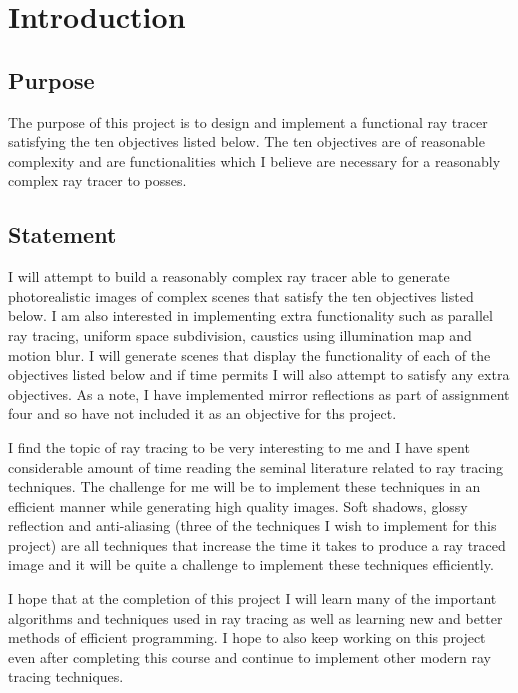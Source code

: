 \chapter{Introduction}

\section{Purpose}
The purpose of this project is to design and implement a functional ray tracer
satisfying the ten objectives listed below. The ten objectives are of reasonable
complexity and are functionalities which I believe are necessary for a 
reasonably complex ray tracer to posses.

\section{Statement}
I will attempt to build a reasonably complex ray tracer able to generate
photorealistic images of complex scenes that satisfy the ten objectives listed
below. I am also interested in implementing extra functionality such as parallel
ray tracing, uniform space subdivision, caustics using illumination map and
motion blur. I will generate scenes that display the functionality of each of
the objectives listed below and if time permits I will also attempt to satisfy
any extra objectives. As a note, I have implemented mirror reflections as part
of assignment four and so have not included it as an objective for ths project.

I find the topic of ray tracing to be very interesting to me and I have spent
considerable amount of time reading the seminal literature related to ray
tracing techniques. The challenge for me will be to implement these techniques
in an efficient manner while generating high quality images. Soft shadows,
glossy reflection and anti-aliasing (three of the techniques I wish to implement
for this project) are all techniques that increase the time it takes to produce
a ray traced image and it will be quite a challenge to implement these
techniques efficiently.

I hope that at the completion of this project I will learn many of the important
algorithms and techniques used in ray tracing as well as learning new and better
methods of efficient programming. I hope to also keep working on this project
even after completing this course and continue to implement other modern ray
tracing techniques.

